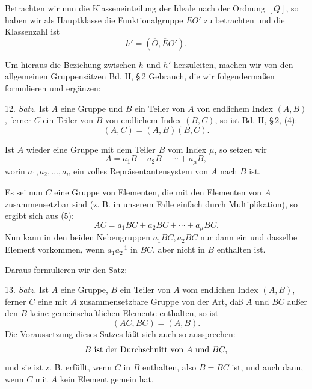 \documentclass[11pt]{article}
\begin{document}
Betrachten wir nun die Klasseneinteilung der Ideale nach der Ordnung \([Q]\), so haben wir als Hauptklasse die Funktionalgruppe \(\overline EO'\) zu betrachten und die Klassenzahl ist
\begin{equation}
 h'=(\overline O,\overline EO').
\tag{3}
\end{equation}

Um hieraus die Beziehung zwischen \(h\) und \(h'\) herzuleiten, machen wir von den allgemeinen Gruppensätzen Bd. II, \S\,2 Gebrauch, die wir folgendermaßen formulieren und ergänzen:

12. \emph{Satz.} Ist \(A\) eine Gruppe und \(B\) ein Teiler von \(A\) von endlichem Index \((A,B)\), ferner \(C\) ein Teiler von \(B\) von endlichem Index \((B,C)\), so ist Bd. II, \S\,2, (4):
\begin{equation}
 (A,C)=(A,B)(B,C).
\tag{4}
\end{equation}

Ist \(A\) wieder eine Gruppe mit dem Teiler \(B\) vom Index \(\mu\), so setzen wir
\begin{equation}
 A=a_1B+a_2B+\cdots+a_\mu B,
\tag{5}
\end{equation}
worin \(a_1,a_2,\ldots,a_\mu\) ein volles Repräsentantensystem von \(A\) nach \(B\) ist.

Es sei nun \(C\) eine Gruppe von Elementen, die mit den Elementen von \(A\) zusammensetzbar sind (z. B. in unserem Falle einfach durch Multiplikation), so ergibt sich aus (5):
\begin{equation}
 AC=a_1BC+a_2BC+\cdots+a_\mu BC.
\tag{6}
\end{equation}
Nun kann in den beiden Nebengruppen \(a_1BC,a_2BC\) nur dann ein und dasselbe Element vorkommen, wenn \(a_1a_2^{-1}\) in \(BC\), aber nicht in \(B\) enthalten ist.

Daraus formulieren wir den Satz:

13. \emph{Satz.} Ist \(A\) eine Gruppe, \(B\) ein Teiler von \(A\) vom endlichen Index \((A,B)\), ferner \(C\) eine mit \(A\) zusammensetzbare Gruppe von der Art, daß \(A\) und \(BC\) außer den \(B\) keine gemeinschaftlichen Elemente enthalten, so ist
\begin{equation}
 (AC,BC)=(A,B).
\tag{7}
\end{equation}
Die Voraussetzung dieses Satzes läßt sich auch so aussprechen:
\[
 B\hbox{ ist der Durchschnitt von }A\hbox{ und }BC,
\]
und sie ist z. B. erfüllt, wenn \(C\) in \(B\) enthalten, also \(B=BC\) ist, und auch dann, wenn \(C\) mit \(A\) kein Element gemein hat.
\end{document}
